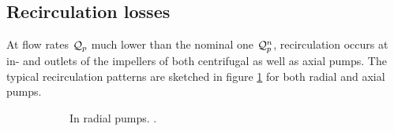\subsection{Recirculation losses}

At flow rates $\mathcal Q_p$ much lower than the nominal one $\mathcal Q_p^n$,
recirculation occurs at in- and outlets of the impellers of both
centrifugal as well as axial pumps. The typical recirculation patterns
are sketched in figure \ref{fig:recirculationRadial} for both radial
and axial pumps.
\begin{figure}[!h]
  \begin{subfigure}{0.49\textwidth}
    \caption{In radial pumps. \leonard.}
    \label{fig:recirculationRadial}
  \end{subfigure}
  \begin{subfigure}{0.49\textwidth}

\end{subfigure}
\end{figure}
